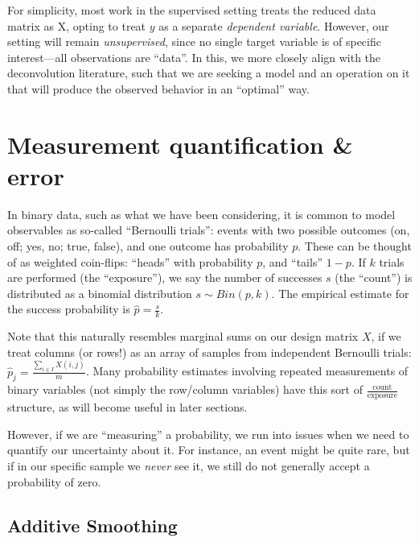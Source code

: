 \documentclass[%
	12pt,
		oneside,
		letterpaper
]{book}
\begin{document}
For simplicity, most work in the supervised setting treats the reduced
data matrix as X, opting to treat \(y\) as a separate \emph{dependent
variable}. However, our setting will remain \emph{unsupervised}, since
no single target variable is of specific interest---all observations are
``data''. In this, we more closely align with the deconvolution
literature, such that we are seeking a model and an operation on it that
will produce the observed behavior in an ``optimal'' way.

\section{Measurement quantification \& error}\label{sec-smooth-err}

In binary data, such as what we have been considering, it is common to
model observables as so-called ``Bernoulli trials'': events with two
possible outcomes (on, off; yes, no; true, false), and one outcome has
probability \(p\). These can be thought of as weighted coin-flips:
``heads'' with probability \(p\), and ``tails'' \(1-p\). If \(k\) trials
are performed (the ``exposure''), we say the number of successes \(s\)
(the ``count'') is distributed as a binomial distribution
\(s\sim Bin(p,k)\). The empirical estimate for the success probability
is \(\hat{p}=\tfrac{s}{k}\).

Note that this naturally resembles marginal sums on our design matrix
\(X\), if we treat columns (or rows!) as an array of samples from
independent Bernoulli trials:
\(\hat{p}_j = \frac{\sum_{i\in I} X(i,j)}{m}\). Many probability
estimates involving repeated measurements of binary variables (not
simply the row/column variables) have this sort of
\(\frac{\textrm{count}}{\textrm{exposure}}\) structure, as will become
useful in later sections.

However, if we are ``measuring'' a probability, we run into issues when
we need to quantify our uncertainty about it. For instance, an event
might be quite rare, but if in our specific sample we \emph{never} see
it, we still do not generally accept a probability of zero.

\subsection{Additive Smoothing}\label{sec-counting}
\end{document}
